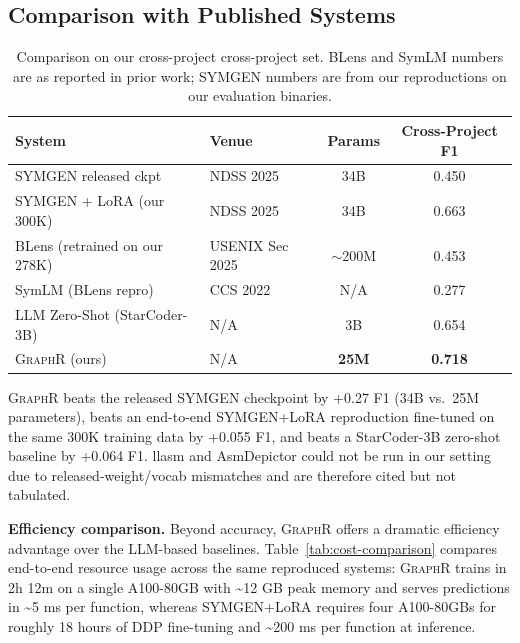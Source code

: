 \documentclass[sigconf,nonacm]{acmart}
\newcommand{\sysname}{\textsc{GraphR}}
\begin{document}
\subsection{Comparison with Published Systems}

\begin{table}[t]
    \centering
    \caption{Comparison on our cross-project cross-project set. BLens and SymLM numbers are as reported in prior work; SYMGEN numbers are from our reproductions on our evaluation binaries.}
    \label{tab:comparison}
    \footnotesize
    \begin{tabular}{llcc}
        \toprule
        \textbf{System} & \textbf{Venue} & \textbf{Params} & \textbf{Cross-Project F1} \\
        \midrule
        SYMGEN released ckpt~\cite{symgen} & NDSS 2025 & 34B & 0.450 \\
        SYMGEN + LoRA (our 300K)           & NDSS 2025 & 34B & 0.663 \\
        BLens (retrained on our 278K)~\cite{blens}        & USENIX Sec 2025 & $\sim$200M & 0.453 \\
        SymLM (BLens repro)~\cite{symlm,blens} & CCS 2022 & N/A & 0.277 \\
        LLM Zero-Shot (StarCoder-3B)        & N/A & 3B & 0.654 \\
        \sysname{} (ours)                   & N/A & \textbf{25M} & \textbf{0.718} \\
        \bottomrule
    \end{tabular}
\end{table}

\sysname{} beats the released SYMGEN checkpoint by +0.27 F1 (34B vs.\ 25M parameters), beats an end-to-end SYMGEN+LoRA reproduction fine-tuned on the same 300K training data by +0.055 F1, and beats a StarCoder-3B zero-shot baseline by +0.064 F1. llasm and AsmDepictor could not be run in our setting due to released-weight/vocab mismatches and are therefore cited but not tabulated.

\textbf{Efficiency comparison.} Beyond accuracy, \sysname{} offers a dramatic efficiency advantage over the LLM-based baselines. Table~\ref{tab:cost-comparison} compares end-to-end resource usage across the same reproduced systems: \sysname{} trains in 2h 12m on a single A100-80GB with \textasciitilde{}12 GB peak memory and serves predictions in \textasciitilde{}5 ms per function, whereas SYMGEN+LoRA requires four A100-80GBs for roughly 18 hours of DDP fine-tuning and \textasciitilde{}200 ms per function at inference.
\end{document}

